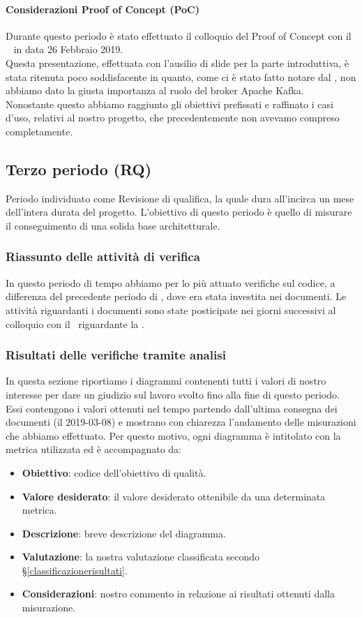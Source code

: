 	\paragraph{Considerazioni Proof of Concept (PoC)}
	Durante questo periodo è stato effettuato il colloquio del Proof of Concept con il \RC~ in data 26 Febbraio 2019.\\
	Questa presentazione, effettuata con l'ausilio di slide per la parte introduttiva, è stata ritenuta poco soddisfacente in quanto, come ci è stato fatto notare dal \RC, non abbiamo dato la giusta importanza al ruolo del broker Apache Kafka.\\
	Nonostante questo abbiamo raggiunto gli obiettivi prefissati e raffinato i casi d'uso, relativi al nostro progetto, che precedentemente non avevamo compreso completamente.

	\subsection{Terzo periodo (RQ)}\label{TerzoPeridodoRQ}
	Periodo individuato come Revisione di qualifica, la quale dura all'incirca un mese dell'intera durata
	del progetto. L'obiettivo di questo periodo è quello di misurare il conseguimento di una solida base
	architetturale.

	\subsubsection{Riassunto delle attività di verifica}
	In questo periodo di tempo abbiamo per lo più attuato verifiche sul codice, a differenza del precedente
	periodo di \RP, dove era stata investita nei documenti. Le attività riguardanti i documenti sono state posticipate nei giorni successivi al colloquio con il \RC\ riguardante la .

	\subsubsection{Risultati delle verifiche tramite analisi}
	In questa sezione riportiamo i diagrammi contenenti tutti i valori di nostro interesse per dare un giudizio sul lavoro svolto fino alla fine di questo periodo.
	Essi contengono i valori ottenuti nel tempo partendo dall'ultima consegna dei documenti (il 2019-03-08) e mostrano con chiarezza l'andamento delle misurazioni che abbiamo effettuato.
	Per questo motivo, ogni diagramma è intitolato con la metrica utilizzata ed è accompagnato da:
	\begin{itemize}
		\item \textbf{Obiettivo}: codice dell'obiettivo di qualità.
		\item \textbf{Valore desiderato}: il valore desiderato ottenibile da una determinata metrica.
		\item \textbf{Descrizione}: breve descrizione del diagramma.
		\item \textbf{Valutazione}: la nostra valutazione classificata secondo \S\ref{classificazionerisultati}.
		\item \textbf{Considerazioni}: nostro commento in relazione ai risultati ottenuti dalla misurazione.
	\end{itemize}

